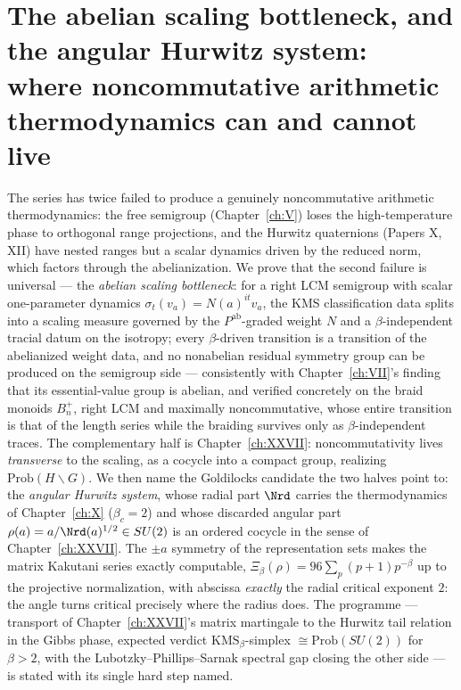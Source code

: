 \chapter[The abelian scaling bottleneck and the angular system]{The abelian scaling bottleneck, and the angular Hurwitz system:\\ where noncommutative arithmetic thermodynamics can and cannot live}\label{ch:XXXIV}
\renewcommand{\Prob}{\mathrm{Prob}}
\begin{summary}
The series has twice failed to produce a genuinely noncommutative arithmetic
thermodynamics: the free semigroup (Chapter~\ref{ch:V}) loses the high-temperature phase to
orthogonal range projections, and the Hurwitz quaternions (Papers X, XII) have nested
ranges but a scalar dynamics driven by the reduced norm, which factors through the
abelianization. We prove that the second failure is universal --- the \emph{abelian
scaling bottleneck}: for a right LCM semigroup with scalar one-parameter dynamics
$\sigma_t(v_a)=N(a)^{it}v_a$, the KMS classification data splits into a scaling measure
governed by the $P^{\mathrm{ab}}$-graded weight $N$ and a $\beta$-independent tracial datum on
the isotropy; every $\beta$-driven transition is a transition of the abelianized weight
data, and no nonabelian residual symmetry group can be produced on the semigroup side
--- consistently with Chapter~\ref{ch:VII}'s finding that its essential-value group is abelian, and
verified concretely on the braid monoids $B_n^+$, right LCM and maximally noncommutative,
whose entire transition is that of the length series while the braiding survives only as
$\beta$-independent traces. The complementary half is Chapter~\ref{ch:XXVII}: noncommutativity lives
\emph{transverse} to the scaling, as a cocycle into a compact group, realizing
$\Prob(H\backslash G)$. We then name the Goldilocks candidate the two halves point to:
the \emph{angular Hurwitz system}, whose radial part $\Nrd$ carries the thermodynamics of
Chapter~\ref{ch:X} ($\beta_c=2$) and whose discarded angular part $\rho(a)=a/\Nrd(a)^{1/2}\in SU(2)$
is an ordered cocycle in the sense of Chapter~\ref{ch:XXVII}. The $\pm a$ symmetry of the
representation sets makes the matrix Kakutani series exactly computable,
$\Xi_\beta(\rho)=96\sum_p(p{+}1)p^{-\beta}$ up to the projective normalization, with
abscissa \emph{exactly} the radial critical exponent $2$: the angle turns critical
precisely where the radius does. The programme --- transport of Chapter~\ref{ch:XXVII}'s matrix
martingale to the Hurwitz tail relation in the Gibbs phase, expected verdict
$\mathrm{KMS}_\beta$-simplex $\cong\Prob(SU(2))$ for $\beta>2$, with the
Lubotzky--Phillips--Sarnak spectral gap closing the other side --- is stated with its
single hard step named.
\end{summary}


